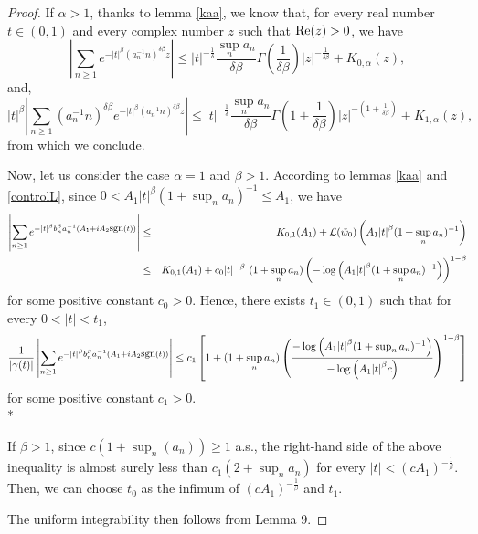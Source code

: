 \documentclass[oneside, a4paper,11pt,reqno]{amsart}
\begin{document}
\begin{proof}
If $\alpha>1$, thanks to lemma \ref{kaa}, we know that, 
for every real number $t\in(0,1)$ and every complex number $z$ such that $\text{\rm Re}(z)>0$,
we have
\begin{equation}\label{eq1}
\left|  \sum_{n\ge 1}e^{-|t|^\beta (a_n^{-1} n)^{\delta\beta}z}\right|
  \le  |t|^{-\frac 1\delta} 
    \frac{\sup_n a_n}{\delta\beta}\Gamma\left(\frac 
    1{\delta\beta}\right)|z|^{-\frac 1{\delta\beta}}+K_{0,\alpha}(z),
\end{equation}
and,
\begin{equation}\label{eq2}
|t|^\beta  \left|  \sum_{n\ge 1} (a_n^{-1} n)^{\delta\beta}   
   e^{-|t|^{\beta}(a_n^{-1} n)^{\delta\beta}z } \right|
  \le  |t|^{-\frac 1\delta} 
    \frac{\sup_n a_n}{\delta\beta} \Gamma\left(1+\frac1{\delta\beta}\right) 
   |z|^{-(1+\frac 1{\delta\beta})}+K_{1,\alpha}(z),
\end{equation}
from which we conclude.

Now, let us consider the case $\alpha=1$ and $\beta > 1$.
According to lemmas \ref{kaa} and \ref{controlL}, since
$0<A_1{|t|}^{\beta}(1+\sup_n a_n)^{-1}\le A_1$, we have
\begin{eqnarray*}
 \left|\sum_{n\ge 1} e^{-{|t|}^{\beta}  b_n^{\beta}a_n^{-1}(A_1+iA_2 \mbox{\small sgn}(t))}\right|
& \le  &K_{0,1}(A_1)+ {\mathcal L}(\tilde w_0)\left( A_1{|t|}^{\beta}(1+\sup_n a_n)^{-1} \right)\\
& \le &K_{0,1}(A_1) + c_0  |t|^{-\beta}\  (1+\sup_n a_n)  \left( - \log  \Big( A_1{|t|}^{\beta}(1+\sup_n a_n)^{-1} \Big)\right)^{1-\beta}
\end{eqnarray*}
for some positive constant $c_0>0$. Hence, there exists $t_1\in(0,1)$ 
such that for every $0<|t|<t_1$, 
$$
\frac{1}{|\gamma(t)|} \left|\sum_{n\ge 1} e^{-{|t|}^{\beta}     b_n^{\beta}a_n^{-1}(A_1+iA_2 \mbox{\small sgn}(t))}\right|
 \le c_1 \left[1+ (1+\sup_n a_n)  \left( \frac{- \log  \Big( A_1{|t|}^{\beta}(1+\sup_n a_n)^{-1} \Big)}{- \log  \Big( A_1{|t|}^{\beta}c\Big)}\right)^{1-\beta}\right]$$
for some positive constant $c_1>0$.\\*
  
  
\noindent If $\beta> 1$, since $c(1+\sup_n(a_n) )\ge 1$ a.s., the right-hand side of the above inequality is almost surely less than
$c_1 (2+\sup_n a_n)$ for every $|t|<(cA_1)^{-\frac 1\beta}$. Then, we can choose $t_0$ as the infimum of $(cA_1)^{-\frac 1\beta} $ and $t_1$.
  
   
   
The uniform integrability then follows from Lemma 9. 
\end{proof}
\end{document}
